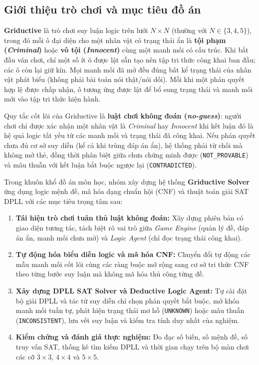\subsection{Giới thiệu trò chơi và mục tiêu đồ án}
\label{subsec:project_overview}

\textbf{Griductive} là trò chơi suy luận logic trên lưới $N \times N$ (thường với $N \in \{3, 4, 5\}$), trong đó mỗi ô đại diện cho một nhân vật có trạng thái ẩn là \textbf{tội phạm (\textit{Criminal})} hoặc \textbf{vô tội (\textit{Innocent})} cùng một manh mối có cấu trúc. Khi bắt đầu ván chơi, chỉ một số ít ô được lật sẵn tạo nên tập tri thức công khai ban đầu; các ô còn lại giữ kín. Mọi manh mối đã mở đều đúng bất kể trạng thái của nhân vật phát biểu (không phải bài toán nói thật/nói dối). Mỗi khi một phán quyết hợp lệ được chấp nhận, ô tương ứng được lật để bổ sung trạng thái và manh mối mới vào tập tri thức hiện hành.

Quy tắc cốt lõi của Griductive là \textbf{luật chơi không đoán (\textit{no-guess})}: người chơi chỉ được xác nhận một nhân vật là \textit{Criminal} hay \textit{Innocent} khi kết luận đó là hệ quả logic tất yếu từ các manh mối và trạng thái đã công khai. Nếu phán quyết chưa đủ cơ sở suy diễn (kể cả khi trùng đáp án ẩn), hệ thống phải từ chối mà không mở thẻ, đồng thời phân biệt giữa chưa chứng minh được (\texttt{NOT\_PROVABLE}) và mâu thuẫn với kết luận bắt buộc ngược lại (\texttt{CONTRADICTED}).

Trong khuôn khổ đồ án môn học, nhóm xây dựng hệ thống \textbf{Griductive Solver} ứng dụng logic mệnh đề, mã hóa dạng chuẩn hội (CNF) và thuật toán giải SAT DPLL với các mục tiêu trọng tâm sau:
\begin{enumerate}
    \item \textbf{Tái hiện trò chơi tuân thủ luật không đoán:} Xây dựng phiên bản có giao diện tương tác, tách biệt rõ vai trò giữa \textit{Game Engine} (quản lý đề, đáp án ẩn, manh mối chưa mở) và \textit{Logic Agent} (chỉ đọc trạng thái công khai).
    \item \textbf{Tự động hóa biểu diễn logic và mã hóa CNF:} Chuyển đổi tự động các mẫu manh mối cốt lõi cùng các ràng buộc mở rộng sang cơ sở tri thức CNF theo từng bước suy luận mà không mã hóa thủ công từng đề.
    \item \textbf{Xây dựng DPLL SAT Solver và Deductive Logic Agent:} Tự cài đặt bộ giải DPLL và tác tử suy diễn chỉ chọn phán quyết bắt buộc, mở khóa manh mối tuần tự, phát hiện trạng thái mơ hồ (\texttt{UNKNOWN}) hoặc mâu thuẫn (\texttt{INCONSISTENT}), lưu vết suy luận và kiểm tra tính duy nhất của nghiệm.
    \item \textbf{Kiểm chứng và đánh giá thực nghiệm:} Đo đạc số biến, số mệnh đề, số truy vấn SAT, thống kê tìm kiếm DPLL và thời gian chạy trên bộ màn chơi các cỡ $3 \times 3$, $4 \times 4$ và $5 \times 5$.
\end{enumerate}


